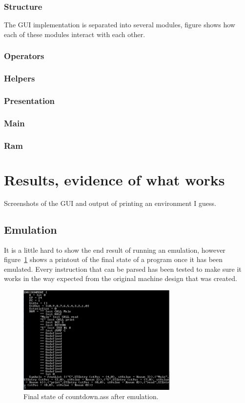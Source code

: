 \documentclass[10point]{article}
\begin{document}
\subsubsection{Structure}

The GUI implementation is separated into several modules, figure shows how each of these modules interact with each other.

\subsubsection{Operators}

    
\subsubsection{Helpers}


\subsubsection{Presentation}

    
\subsubsection{Main}

    
\subsubsection{Ram}


\section{Results, evidence of what works}
Screenshots of the GUI and output of printing an environment I guess.

\subsection{Emulation}
It is a little hard to show the end result of running an emulation, however figure~\ref{fig:EmulationResult} shows a printout of the final state of a program once it has been emulated. Every instruction that can be parsed has been tested to make sure it works in the way expected from the original machine design that was created.

\begin{figure}[h]
    \centering
    \includegraphics[width=300px]{EmulationResult}
    \caption{Final state of countdown.ass after emulation.}
    \label{fig:EmulationResult}
\end{figure}
\end{document}
